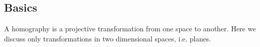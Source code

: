 \subsection{Basics}
A homography is a projective transformation from one space to another.
Here we discuss only transformations in two dimensional spaces, i.e. planes.

